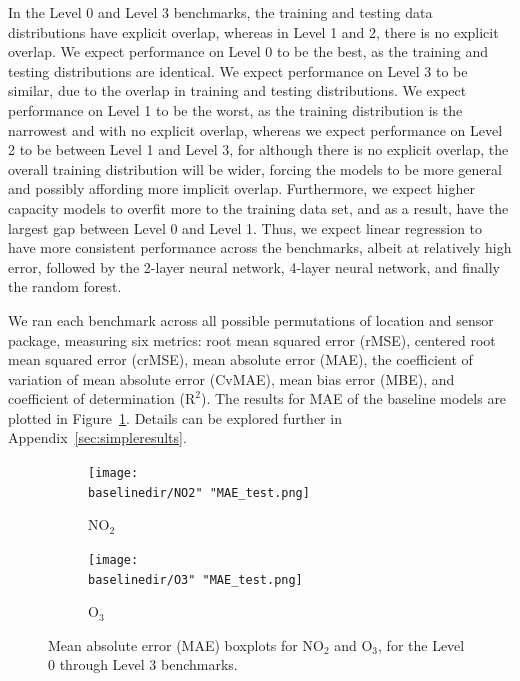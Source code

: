 \documentclass[journal abbreviation, manuscript]{copernicus}
\newcommand{\textus}[1]{$_{\text{#1}}$}
\begin{document}
In the Level 0 and Level 3 benchmarks, the training and testing data distributions have explicit overlap, whereas in Level 1 and 2, there is no explicit overlap. We expect performance on Level 0 to be the best, as the training and testing distributions are identical.  We expect performance on Level 3 to be similar, due to the overlap in training and testing distributions. We expect performance on Level 1 to be the worst, as the training distribution is the narrowest and with no explicit overlap, whereas we expect performance on Level 2 to be between Level 1 and Level 3, for although there is no explicit overlap, the overall training distribution will be wider, forcing the models to be more general and possibly affording more implicit overlap.  Furthermore, we expect higher capacity models to overfit more to the training data set, and as a result, have the largest gap between Level 0 and Level 1. Thus, we expect linear regression to have more consistent performance across the benchmarks, albeit at relatively high error, followed by the 2-layer neural network, 4-layer neural network, and finally the random forest.

We ran each benchmark across all possible permutations of location and sensor package, measuring six metrics: root mean squared error (rMSE), centered root mean squared error (crMSE), mean absolute error (MAE), the coefficient of variation of mean absolute error (CvMAE), mean bias error (MBE), and coefficient of determination ($\textrm{R}^2$). The results for MAE of the baseline models are plotted in Figure~\ref{fig:results-linear}.  Details can be explored further in Appendix~\ref{sec:simpleresults}.

\begin{figure}[t]
\centering
\begin{subfigure}{0.45\textwidth}
\texttt{[image: \\baselinedir/NO2" "MAE\_test.png]}
\caption{NO\textus{2}}
\end{subfigure}
\begin{subfigure}{0.45\textwidth}
\texttt{[image: \\baselinedir/O3" "MAE\_test.png]}
\caption{O\textus{3}}
\end{subfigure}
\caption{Mean absolute error (MAE) boxplots for NO\textus{2} and O\textus{3}, for the Level 0 through Level 3 benchmarks.}
\label{fig:results-linear}
\end{figure}
\end{document}
